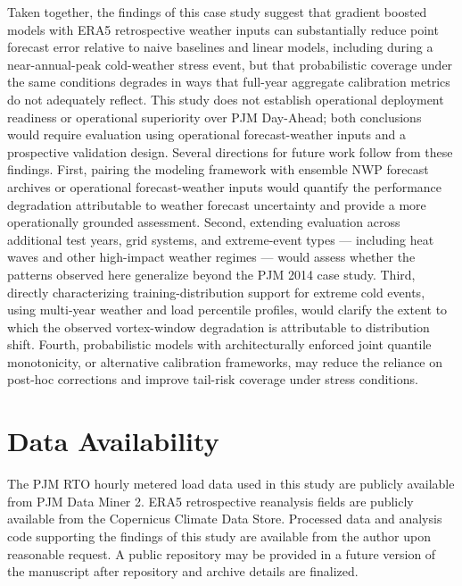 \documentclass[12pt,a4paper]{article}
\begin{document}
Taken together, the findings of this case study suggest that gradient boosted models with ERA5 retrospective weather inputs can substantially reduce point forecast error relative to naive baselines and linear models, including during a near-annual-peak cold-weather stress event, but that probabilistic coverage under the same conditions degrades in ways that full-year aggregate calibration metrics do not adequately reflect. This study does not establish operational deployment readiness or operational superiority over PJM Day-Ahead; both conclusions would require evaluation using operational forecast-weather inputs and a prospective validation design. Several directions for future work follow from these findings. First, pairing the modeling framework with ensemble NWP forecast archives or operational forecast-weather inputs would quantify the performance degradation attributable to weather forecast uncertainty and provide a more operationally grounded assessment. Second, extending evaluation across additional test years, grid systems, and extreme-event types --- including heat waves and other high-impact weather regimes --- would assess whether the patterns observed here generalize beyond the PJM 2014 case study. Third, directly characterizing training-distribution support for extreme cold events, using multi-year weather and load percentile profiles, would clarify the extent to which the observed vortex-window degradation is attributable to distribution shift. Fourth, probabilistic models with architecturally enforced joint quantile monotonicity, or alternative calibration frameworks, may reduce the reliance on post-hoc corrections and improve tail-risk coverage under stress conditions.

\section*{Data Availability}

The PJM RTO hourly metered load data used in this study are publicly available from PJM Data Miner 2. ERA5 retrospective reanalysis fields are publicly available from the Copernicus Climate Data Store. Processed data and analysis code supporting the findings of this study are available from the author upon reasonable request. A public repository may be provided in a future version of the manuscript after repository and archive details are finalized.
\end{document}
